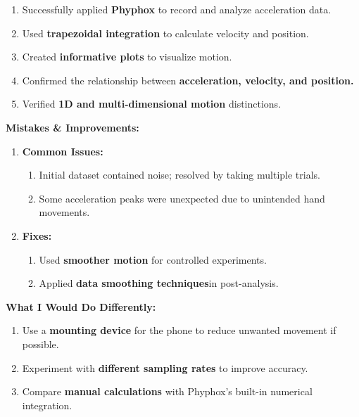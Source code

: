 \documentclass[idxtotoc,hyperref,openany]{labbook} %
\begin{document}

\begin{enumerate}[$\bullet$]
    \item Successfully applied \textbf{Phyphox} to record and analyze acceleration data.
    \item Used \textbf{trapezoidal integration} to calculate velocity and position.
    \item Created \textbf{informative plots} to visualize motion.
    \item Confirmed the relationship between \textbf{acceleration, velocity, and position.}
    \item Verified \textbf{1D and multi-dimensional motion} distinctions.
\end{enumerate}


\textbf{Mistakes \& Improvements:}
\begin{enumerate}[$\bullet$]
    \item \textbf{Common Issues:}
    \begin{enumerate}[$\bullet$]
        \item Initial dataset contained noise; resolved by taking multiple trials.
        \item Some acceleration peaks were unexpected due to unintended hand movements.
    \end{enumerate}
    \item \textbf{Fixes:}
    \begin{enumerate}[$\bullet$]
        \item Used \textbf{smoother motion} for controlled experiments.
        \item Applied \textbf{data smoothing techniques}in post-analysis.
    \end{enumerate}
\end{enumerate}
\textbf{What I Would Do Differently:}
\begin{enumerate}[$\bullet$]
    \item Use a \textbf{mounting device} for the phone to reduce unwanted movement if possible.
    \item Experiment with \textbf{different sampling rates} to improve accuracy.
    \item Compare \textbf{manual calculations} with Phyphox’s built-in numerical integration.
\end{enumerate}
\end{document}
